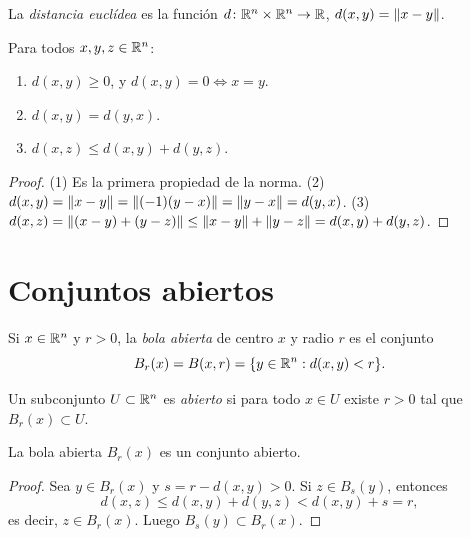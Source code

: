 \begin{definition}
  La \emph{distancia euclídea} es la función \(d\colon \mathbb{R}^n \times \mathbb{R}^n \to \mathbb{R}\), \(d(x, y) = \left\lVert x - y \right\rVert\).
\end{definition}

\begin{prop}
  Para todos \(x, y, z \in \mathbb{R}^n\):
  \begin{enumerate}[label=(\arabic*)]
    \item \(d(x, y) \geq 0\), y \(d(x, y) = 0 \iff x = y\).
    \item \(d(x, y) = d(y, x)\).
    \item \(d(x, z) \leq d(x, y) + d(y, z)\).
  \end{enumerate}
\end{prop}

\begin{proof}
  (1) Es la primera propiedad de la norma. (2) \(d(x, y) = \left\lVert x - y \right\rVert = \left\lVert (-1)(y - x) \right\rVert = \left\lVert y - x \right\rVert = d(y, x)\). (3) \(d(x, z) = \left\lVert (x - y) + (y - z) \right\rVert \leq \left\lVert x - y \right\rVert + \left\lVert y - z \right\rVert = d(x, y) + d(y, z)\).
\end{proof}

\section{Conjuntos abiertos}

\begin{definition}
  Si \(x \in \mathbb{R}^n\) y \(r > 0\), la \emph{bola abierta} de centro \(x\) y radio \(r\) es el conjunto
  \[
    B_r(x) = B(x, r) = \{ y \in \mathbb{R}^n : d(x, y) < r \}.
  \]
\end{definition}

\begin{definition}
  Un subconjunto \(U \subset \mathbb{R}^n\) es \emph{abierto} si para todo \(x \in U\) existe \(r > 0\) tal que \(B_r(x) \subset U\).
\end{definition}

\begin{lemma}
  La bola abierta \(B_r(x)\) es un conjunto abierto.
\end{lemma}

\begin{proof}
  Sea \(y \in B_r(x)\) y \(s = r - d(x, y) > 0\). Si \(z \in B_s(y)\), entonces
  \[
    d(x, z) \leq d(x, y) + d(y, z) < d(x, y) + s = r,
  \]
  es decir, \(z \in B_r(x)\). Luego \(B_s(y) \subset B_r(x)\).
\end{proof}

